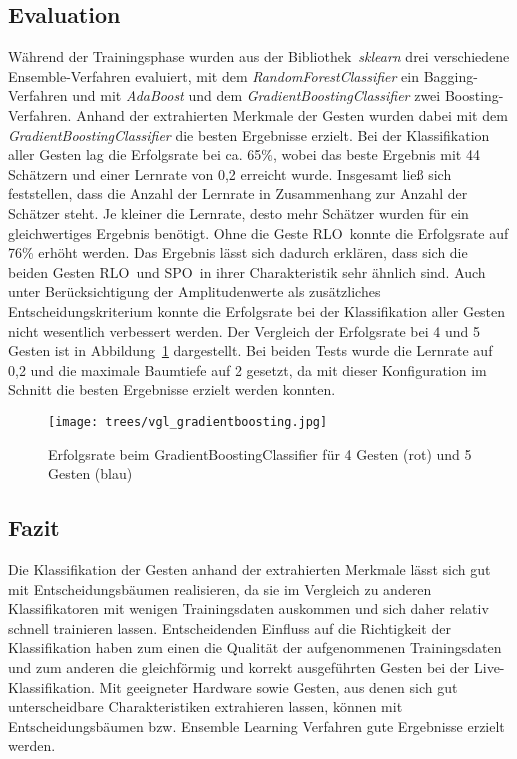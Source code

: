 \subsection{Evaluation}
Während der Trainingsphase wurden aus der Bibliothek~\textit{sklearn} drei verschiedene Ensemble-Verfahren evaluiert, mit dem \textit{RandomForestClassifier} ein Bagging-Verfahren und mit \textit{AdaBoost} und dem \textit{GradientBoostingClassifier} zwei Boosting-Verfahren. 
Anhand der extrahierten Merkmale der Gesten wurden dabei mit dem \textit{GradientBoostingClassifier} die besten Ergebnisse erzielt. 
Bei der Klassifikation aller Gesten lag die Erfolgsrate bei ca. 65\%, wobei das beste Ergebnis mit 44 Schätzern und einer Lernrate von 0,2 erreicht wurde. 
Insgesamt ließ sich feststellen, dass die Anzahl der Lernrate in Zusammenhang zur Anzahl der Schätzer steht. 
Je kleiner die Lernrate, desto mehr Schätzer wurden für ein gleichwertiges Ergebnis benötigt. 
Ohne die Geste \glqq \acl{RLO}\grqq\ konnte die Erfolgsrate auf 76\% erhöht werden.
Das Ergebnis lässt sich dadurch erklären, dass sich die beiden Gesten \glqq \acl{RLO}\grqq\ und \glqq \acl{SPO}\grqq\ in ihrer Charakteristik sehr ähnlich sind. 
Auch unter Berücksichtigung der Amplitudenwerte als zusätzliches Entscheidungskriterium konnte die Erfolgsrate bei der Klassifikation aller Gesten nicht wesentlich verbessert werden. Der Vergleich der Erfolgsrate bei 4 und 5 Gesten ist in Abbildung~\ref{fig:vgl_gradientboosting} dargestellt. Bei beiden Tests wurde die Lernrate auf 0,2 und die maximale Baumtiefe auf 2 gesetzt, da mit dieser Konfiguration im Schnitt die besten Ergebnisse erzielt werden konnten. 

\begin{figure}[htbp] \centering
\texttt{[image: trees/vgl\_gradientboosting.jpg]}
\caption{Erfolgsrate beim GradientBoostingClassifier für 4 Gesten (rot) und 5 Gesten (blau)}
\label{fig:vgl_gradientboosting}
\end{figure}


\subsection{Fazit}
Die Klassifikation der Gesten anhand der extrahierten Merkmale lässt sich gut mit Entscheidungsbäumen realisieren, da sie im Vergleich zu anderen Klassifikatoren mit wenigen Trainingsdaten auskommen und sich daher relativ schnell trainieren lassen.
Entscheidenden Einfluss auf die Richtigkeit der Klassifikation haben zum einen die Qualität der aufgenommenen Trainingsdaten und zum anderen die gleichförmig und korrekt ausgeführten Gesten bei der Live-Klassifikation.
Mit geeigneter Hardware sowie Gesten, aus denen sich gut unterscheidbare Charakteristiken extrahieren lassen, können mit Entscheidungsbäumen bzw. Ensemble Learning Verfahren gute Ergebnisse erzielt werden.
